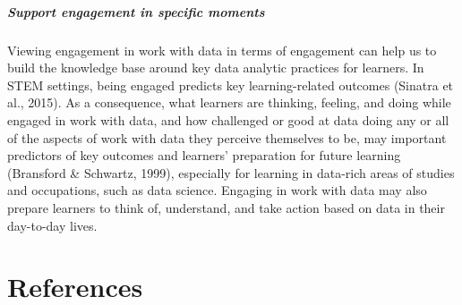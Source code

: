 \documentclass[]{msu-thesis}
\let\oldparagraph\paragraph
\renewcommand{\paragraph}[1]{\oldparagraph{#1}\mbox{}}
\theoremstyle{definition}
\theoremstyle{definition}
\theoremstyle{definition}
\theoremstyle{remark}
\begin{document}
\paragraph{Support engagement in specific
moments}\label{support-engagement-in-specific-moments}

Viewing engagement in work with data in terms of engagement can help us
to build the knowledge base around key data analytic practices for
learners. In STEM settings, being engaged predicts key learning-related
outcomes (Sinatra et al., 2015). As a consequence, what learners are
thinking, feeling, and doing while engaged in work with data, and how
challenged or good at data doing any or all of the aspects of work with
data they perceive themselves to be, may important predictors of key
outcomes and learners' preparation for future learning (Bransford \&
Schwartz, 1999), especially for learning in data-rich areas of studies
and occupations, such as data science. Engaging in work with data may
also prepare learners to think of, understand, and take action based on
data in their day-to-day lives.

\chapter{References}\label{references}
\end{document}
